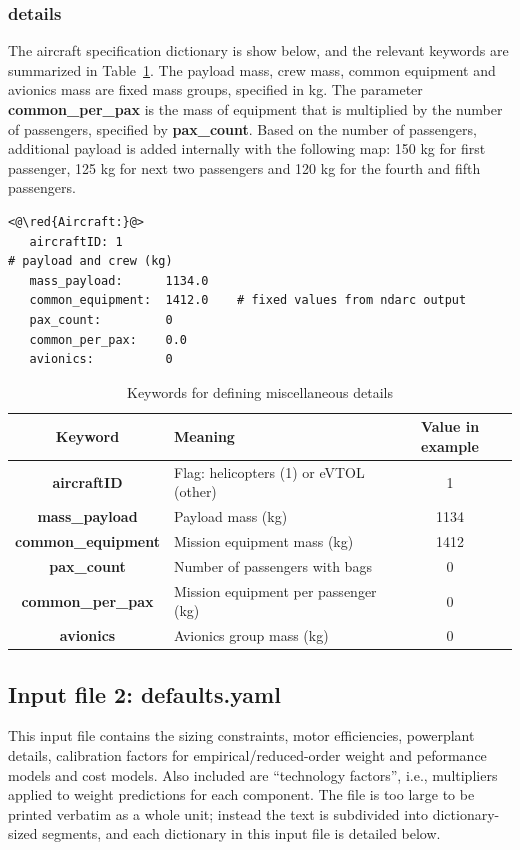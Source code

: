 \subsubsection{ details}
The aircraft specification dictionary is show below, and the relevant keywords are summarized in Table~\ref{tbl:aircraft_keywords}. The payload mass, crew mass, common equipment and avionics mass are fixed mass groups, specified in kg. The parameter \textbf{common\_per\_pax} is the mass of equipment that is multiplied by the number of passengers, specified by \textbf{pax\_count}. Based on the number of passengers, additional payload is added internally with the following map: 150 kg for first passenger, 125 kg for next two passengers and 120 kg for the fourth and fifth passengers.
\begin{lstlisting}
<@\red{Aircraft:}@>
   aircraftID: 1
# payload and crew (kg)
   mass_payload:      1134.0
   common_equipment:  1412.0    # fixed values from ndarc output
   pax_count:         0 
   common_per_pax:    0.0
   avionics:          0
\end{lstlisting}
\begin{center}
  \begin{table}[H]
	\caption{Keywords for defining miscellaneous details}
	\label{tbl:aircraft_keywords}
    \begin{tabular}{| c | l | c |}
    \hline
    Keyword & Meaning & Value in example \\ 
    \hline
\textbf{aircraftID} & Flag: helicopters (1) or eVTOL (other) & 1 \\
\textbf{mass\_payload} & Payload mass (kg) & 1134 \\
\textbf{common\_equipment} & Mission equipment mass (kg) & 1412 \\
\textbf{pax\_count} & Number of passengers with bags & 0 \\
\textbf{common\_per\_pax} & Mission equipment per passenger (kg) & 0 \\
\textbf{avionics} & Avionics group mass (kg) & 0 \\
     \hline
  \end{tabular}
\end{table}
\end{center}
\vspace{-2cm}
\subsection*{Input file 2: defaults.yaml}
This input file contains the sizing constraints, motor efficiencies, powerplant details, calibration factors for empirical/reduced-order weight and peformance models and cost models. Also included are ``technology factors'', i.e., multipliers applied to weight predictions for each component. The file is too large to be printed verbatim as a whole unit; instead the text is subdivided into dictionary-sized segments, and each dictionary in this input file is detailed below. 
\vspace{-0.5cm}

